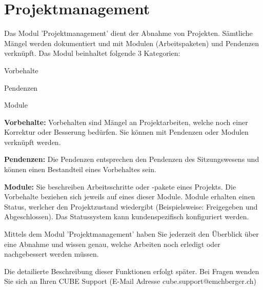
\clearpage
\section{Projektmanagement}

\vspace{\baselineskip}

Das Modul 'Projektmanagement' dient der Abnahme von Projekten. Sämtliche Mängel werden dokumentiert und mit Modulen (Arbeitspaketen) und Pendenzen verknüpft. Das Modul beinhaltet folgende 3 Kategorien:

\vspace{\baselineskip}

\begin{compactitem}
	\item Vorbehalte
	\item Pendenzen
	\item Module
\end{compactitem}

\vspace{\baselineskip}

\textbf{Vorbehalte:} Vorbehalten sind Mängel an Projektarbeiten, welche noch einer Korrektur oder Besserung bedürfen. Sie können mit Pendenzen oder Modulen verknüpft werden.

\vspace{\baselineskip}

\textbf{Pendenzen:} Die Pendenzen entsprechen den Pendenzen des Sitzungswesens und können einen Bestandteil eines Vorbehaltes sein. 

\vspace{\baselineskip}

\textbf{Module:} Sie beschreiben Arbeitsschritte oder -pakete eines Projekts. Die Vorbehalte beziehen sich jeweils auf eines dieser Module. Module erhalten einen Status, werlcher den Projektzustand wiedergibt (Beispielsweise: Freigegeben und Abgeschlossen). Das Statussystem kann kundenspezifisch konfiguriert werden.

\vspace{\baselineskip}

Mittels dem Modul 'Projektmanagement' haben Sie jederzeit den Überblick über eine Abnahme und wissen genau, welche Arbeiten noch erledigt oder nachgebessert werden müssen.

\vspace{\baselineskip}

Die detailierte Beschreibung dieser Funktionen erfolgt später. Bei Fragen wenden Sie sich an Ihren CUBE Support (E-Mail Adresse {\color{red} cube.support@emchberger.ch})









